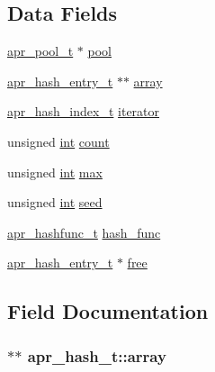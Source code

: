 \subsection*{Data Fields}
\begin{DoxyCompactItemize}
\item 
\hyperlink{structapr__pool__t}{apr\+\_\+pool\+\_\+t} $\ast$ \hyperlink{structapr__hash__t_a3cf4d4547e37a14045a52c96721fa264}{pool}
\item 
\hyperlink{structapr__hash__entry__t}{apr\+\_\+hash\+\_\+entry\+\_\+t} $\ast$$\ast$ \hyperlink{structapr__hash__t_a7cbc1dbad9d2f5a54f8898bc36710cdb}{array}
\item 
\hyperlink{structapr__hash__index__t}{apr\+\_\+hash\+\_\+index\+\_\+t} \hyperlink{structapr__hash__t_aa9910bbc86f0c55a4116477a5873321b}{iterator}
\item 
unsigned \hyperlink{pcre_8txt_a42dfa4ff673c82d8efe7144098fbc198}{int} \hyperlink{structapr__hash__t_ad45893759a12cc13c996089e10b7b1ea}{count}
\item 
unsigned \hyperlink{pcre_8txt_a42dfa4ff673c82d8efe7144098fbc198}{int} \hyperlink{structapr__hash__t_aafd37978458a1b27b083bd09f78ed83e}{max}
\item 
unsigned \hyperlink{pcre_8txt_a42dfa4ff673c82d8efe7144098fbc198}{int} \hyperlink{structapr__hash__t_a99805d60503c1b8384a460f90cde075e}{seed}
\item 
\hyperlink{group__apr__hash_ga0bf5622266af13a2489c907a101cb156}{apr\+\_\+hashfunc\+\_\+t} \hyperlink{structapr__hash__t_a41a2f1e7a20c8ec71680f565d68f61a4}{hash\+\_\+func}
\item 
\hyperlink{structapr__hash__entry__t}{apr\+\_\+hash\+\_\+entry\+\_\+t} $\ast$ \hyperlink{structapr__hash__t_ad14fa35c917620e5ec644bb1b2f5ae36}{free}
\end{DoxyCompactItemize}


\subsection{Field Documentation}
\subsubsection[{\texorpdfstring{array}{array}}]{$\ast$$\ast$ apr\+\_\+hash\+\_\+t\+::array}\hypertarget{structapr__hash__t_a7cbc1dbad9d2f5a54f8898bc36710cdb}{}\label{structapr__hash__t_a7cbc1dbad9d2f5a54f8898bc36710cdb}
